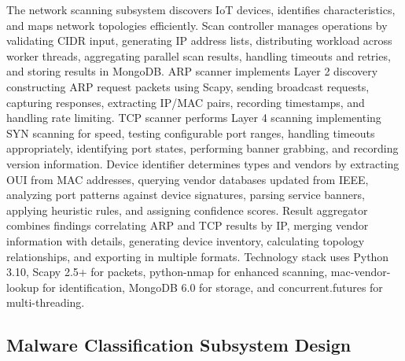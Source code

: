 The network scanning subsystem discovers IoT devices, identifies characteristics, and maps network topologies efficiently. Scan controller manages operations by validating CIDR input, generating IP address lists, distributing workload across worker threads, aggregating parallel scan results, handling timeouts and retries, and storing results in MongoDB. ARP scanner implements Layer 2 discovery constructing ARP request packets using Scapy, sending broadcast requests, capturing responses, extracting IP/MAC pairs, recording timestamps, and handling rate limiting. TCP scanner performs Layer 4 scanning implementing SYN scanning for speed, testing configurable port ranges, handling timeouts appropriately, identifying port states, performing banner grabbing, and recording version information. Device identifier determines types and vendors by extracting OUI from MAC addresses, querying vendor databases updated from IEEE, analyzing port patterns against device signatures, parsing service banners, applying heuristic rules, and assigning confidence scores. Result aggregator combines findings correlating ARP and TCP results by IP, merging vendor information with details, generating device inventory, calculating topology relationships, and exporting in multiple formats. Technology stack uses Python 3.10, Scapy 2.5+ for packets, python-nmap for enhanced scanning, mac-vendor-lookup for identification, MongoDB 6.0 for storage, and concurrent.futures for multi-threading.

\subsection{Malware Classification Subsystem Design}

